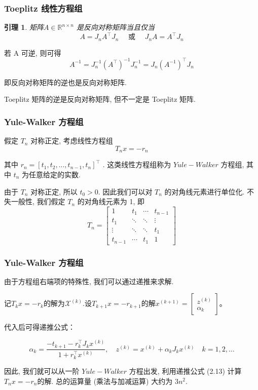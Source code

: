 \documentclass[notheorems,serif]{beamer}
\newcommand{\hei}[1]{{\HEI#1}}
\newtheorem{lemma}{\hei{引理}}
\begin{document}
\begin{frame}
\frametitle{Toeplitz 线性方程组}
\begin{lemma}
	矩阵$ A ∈ \mathbb{R}^{n×n}$ 是反向对称矩阵当且仅当
	\begin{equation}
	A=J_{n} A^{\top} J_{n} \quad \text { 或 } \quad J_{n} A=A^{\top} J_{n}
	\end{equation}
\end{lemma}


若 A 可逆, 则可得
\begin{equation}
A^{-1}=J_{n}^{-1}\left(A^{\top}\right)^{-1} J_{n}^{-1}=J_{n}\left(A^{-1}\right)^{\top} J_{n}
\end{equation}

即反向对称矩阵的逆也是反向对称矩阵.

{\red{$\dagger$}}Toeplitz 矩阵的逆是反向对称矩阵, 但不一定是 Toeplitz 矩阵.
\end{frame}

\begin{frame}
\frametitle{Yule-Walker 方程组}
假定 $T_n$ 对称正定, 考虑线性方程组
\begin{equation}
T_{n} x=-r_{n}
\end{equation}

其中 $r_n = [t_1, t_2, . . . , t_{n−1}, t_n]^{\top}$
. 这类线性方程组称为 $Yule-Walker$ 方程组,
其中 $t_n$ 为任意给定的实数.

由于 $T_n$ 对称正定, 所以 $t_0 > 0$. 因此我们可以对 $T_n$ 的对角线元素进行单位化. 不失一般性, 我们假定 $T_n$ 的对角线元素为 1, 即
\begin{equation}
T_{n}=\left[\begin{array}{cccc}{1} & {t_{1}} & {\cdots} & {t_{n-1}} \\ {t_{1}} & {\ddots} & {\ddots} & {\vdots} \\ {\vdots} & {\ddots} & {\ddots} & {t_{1}} \\ {t_{n-1}} & {\cdots} & {t_{1}} & {1}\end{array}\right]
\end{equation}
\end{frame}

\begin{frame}
\frametitle{Yule-Walker 方程组}
由于方程组右端项的特殊性, 我们可以通过递推来求解.

记$T_{k} x=-r_{k}$的解为$\mathcal{X}^{(k)}$.设$T_{k+1} x=-r_{k+1}$的解$x^{(k+1)}=\left[\begin{array}{c}{z^{(k)}} \\ {\alpha_{k}}\end{array}\right]$。

代入后可得递推公式：

\begin{equation}
\alpha_{k}=\frac{-t_{k+1}-r_{k}^{\top} J_{k} x^{(k)}}{1+r_{k}^{\top} x^{(k)}}, \quad z^{(k)}=x^{(k)}+\alpha_{k} J_{k} x^{(k)} \quad k=1,2, \ldots
\end{equation}

因此, 我们就可以从一阶 $Yule-Walker$ 方程出发, 利用递推公式 (2.13) 计算
$T_nx = −r_n $的解. 总的运算量 (乘法与加减运算) 大约为 $3n^2$.
\end{frame}
\end{document}
